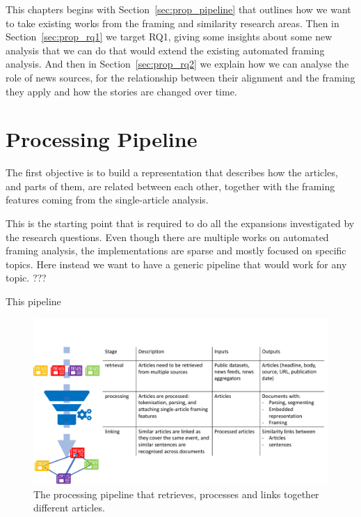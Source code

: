 This chapters begins with Section~\ref{sec:prop_pipeline} that outlines how we want to take existing works from the framing and similarity research areas.
Then in Section~\ref{sec:prop_rq1} we target RQ1, giving some insights about some new analysis that we can do that would extend the existing automated framing analysis.
And then in Section~\ref{sec:prop_rq2} we explain how we can analyse the role of news sources, for the relationship between their alignment and the framing they apply and how the stories are changed over time.

\section{Processing Pipeline}
\label{sec:prop_pipeline}
The first objective is to build a representation that describes how the articles, and parts of them, are related between each other, together with the framing features coming from the single-article analysis.

This is the starting point that is required to do all the expansions investigated by the research questions.
Even though there are multiple works on automated framing analysis, the implementations are sparse and mostly focused on specific topics.
Here instead we want to have a generic pipeline that would work for any topic.
???

This pipeline

\begin{figure}[!htb]
    \centering
    \includegraphics[width=\textwidth]{figures/figure_pipeline.pdf}
    \caption{The processing pipeline that retrieves, processes and links together different articles.}
    \label{fig:pipeline}
\end{figure}

